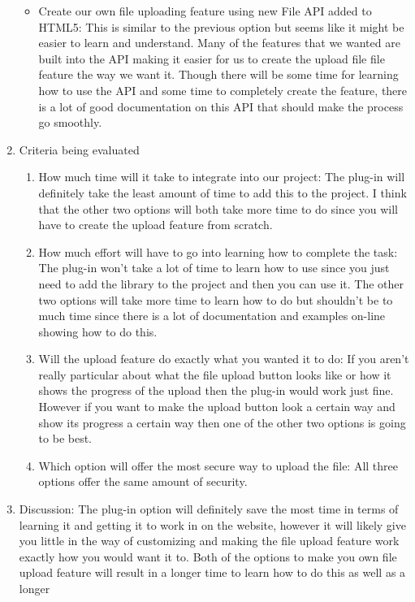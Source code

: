 \documentclass[letterpaper, 10pt, draftclsnofoot, compsoc, onecolumn]{IEEEtran}
\begin{document}
\begin{enumerate}
\begin{itemize}
					\item  Create our own file uploading feature using new File API added to HTML5: This is similar to the previous option but seems like it might 
						be easier to learn and understand. Many of the features that we wanted are built into the API making it easier for us to create the 
						upload file file feature the way we want it. Though there will be some time for learning how to use the API and some time to completely
						create the feature, there is a lot of good documentation on this API that should make the process go smoothly.  
				\end{itemize}
			\item{Criteria being evaluated}
				\begin{enumerate}
					\item How much time will it take to integrate into our project: The plug-in will definitely take the least amount of time to add this to the project. I 
					think that the other two options will both take more time to do since you will have to create the upload feature from scratch.
					\item How much effort will have to go into learning how to complete the task: The plug-in won't take a lot of time to learn how to use since you just 
					need to add the library to the project and then you can use it. The other two options will take more time to learn how to do but shouldn't be to much 
					time since there is a lot of documentation and examples on-line showing how to do this. 
					\item Will the upload feature do exactly what you wanted it to do: If you aren't really particular about what the file upload button looks like or how it shows
					the progress of the upload then the plug-in would work just fine. However if you want to make the upload button look a certain way and show its progress a
					certain way then one of the other two options is going to be best. 
					\item Which option will offer the most secure way to upload the file: All three options offer the same amount of security. 
				\end{enumerate}
			\item{Discussion:} The plug-in option will definitely save the most time in terms of learning it and getting it to work in on the website, 
					however it will likely give you little in the way of customizing and making the file upload feature work exactly how you would want 
					it to. Both of the options to make you own file upload feature will result in a longer time to learn how to do this as well as a longer

\end{enumerate}
\end{document}
